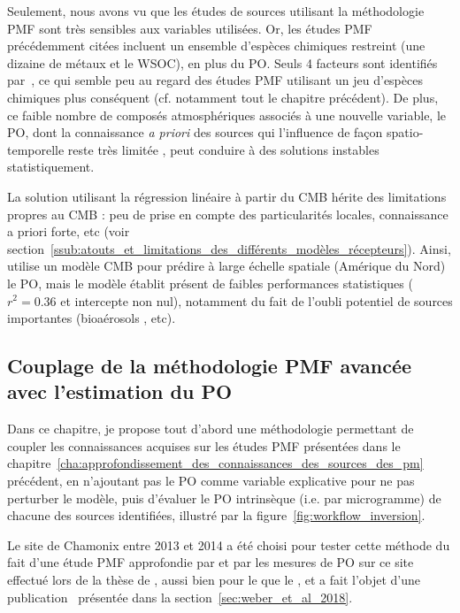 Seulement, nous avons vu que les études de sources utilisant la méthodologie PMF sont très sensibles aux variables utilisées. Or, les
études PMF précédemment citées incluent un ensemble d'espèces chimiques restreint (une dizaine de métaux et le
WSOC), en plus du PO. Seuls 4 facteurs sont identifiés par~\cite{fangOxidative2016}, ce
qui semble peu au regard des études PMF utilisant un jeu d'espèces chimiques plus conséquent (cf.
notamment tout le chapitre précédent). De plus, ce faible nombre de composés atmosphériques
associés à une nouvelle variable, le PO, dont la connaissance \textit{a priori} des sources qui l'influence de façon spatio-temporelle reste très limitée , peut conduire à des solutions instables statistiquement.

La solution utilisant la régression linéaire à partir du CMB hérite des limitations
propres au CMB : peu de prise en compte des particularités locales, connaissance a priori
forte, etc (voir section~\ref{ssub:atouts_et_limitations_des_différents_modèles_récepteurs}).
Ainsi, \cite{batesSource2018} utilise un modèle CMB pour prédire à large échelle spatiale
(Amérique du Nord) le PO, mais le modèle établit présent de faibles performances
statistiques ($r^2 = 0.36$ et intercepte non nul), notamment du fait de l'oubli potentiel de
sources importantes (bioaérosols \autocite{samakeUnexpected2017}, etc).

\subsection{Couplage de la méthodologie PMF avancée avec l'estimation du PO}%
\label{sub:couplage_de_pmf_avancée_avec_l_estimation_du_po}

Dans ce chapitre, je propose tout d'abord une méthodologie permettant de coupler les
connaissances acquises sur les études PMF présentées
dans le chapitre~\ref{cha:approfondissement_des_connaissances_des_sources_des_pm}
précédent, en n'ajoutant pas le PO comme variable explicative pour ne pas perturber le
modèle, puis d'évaluer le PO intrinsèque (i.e. par microgramme) de chacune des sources
identifiées, illustré par la figure~\ref{fig:workflow_inversion}.

Le site de Chamonix entre 2013 et 2014 a été choisi pour tester cette méthode du fait
d'une étude PMF approfondie par \cite{chevrierChauffage2016} et par les mesures de PO sur
ce site effectué lors de la thèse de \cite{calasPollution2017}, aussi bien pour le \POAA{}
que le \PODTT, et a fait l'objet d'une publication~\autocite{weberApportionment2018}
présentée dans la section~\ref{sec:weber_et_al_2018}.

